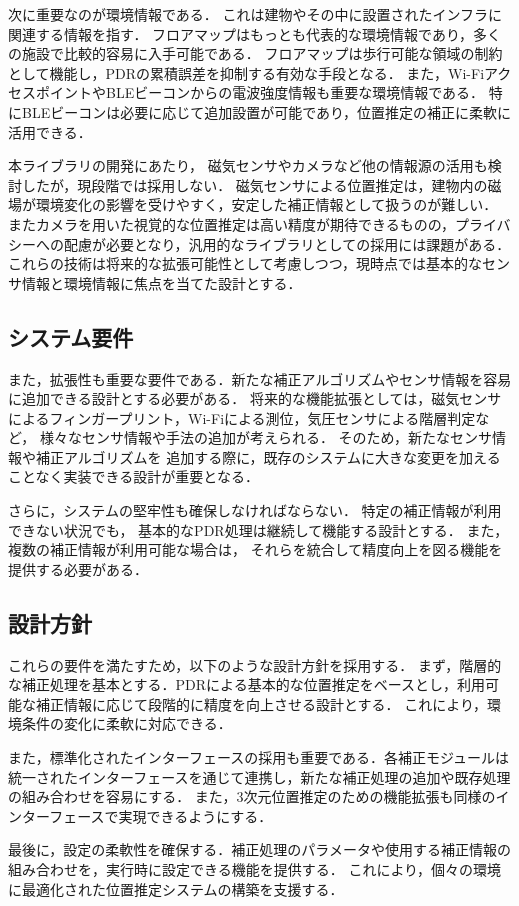 次に重要なのが環境情報である．
これは建物やその中に設置されたインフラに関連する情報を指す．
フロアマップはもっとも代表的な環境情報であり，多くの施設で比較的容易に入手可能である．
フロアマップは歩行可能な領域の制約として機能し，PDRの累積誤差を抑制する有効な手段となる．
また，Wi-FiアクセスポイントやBLEビーコンからの電波強度情報も重要な環境情報である．
特にBLEビーコンは必要に応じて追加設置が可能であり，位置推定の補正に柔軟に活用できる．

本ライブラリの開発にあたり，
磁気センサやカメラなど他の情報源の活用も検討したが，現段階では採用しない．
磁気センサによる位置推定は，建物内の磁場が環境変化の影響を受けやすく，安定した補正情報として扱うのが難しい．
またカメラを用いた視覚的な位置推定は高い精度が期待できるものの，プライバシーへの配慮が必要となり，汎用的なライブラリとしての採用には課題がある．
これらの技術は将来的な拡張可能性として考慮しつつ，現時点では基本的なセンサ情報と環境情報に焦点を当てた設計とする．

\subsection{システム要件}

また，拡張性も重要な要件である．新たな補正アルゴリズムやセンサ情報を容易に追加できる設計とする必要がある．
将来的な機能拡張としては，磁気センサによるフィンガープリント，Wi-Fiによる測位，気圧センサによる階層判定など，
様々なセンサ情報や手法の追加が考えられる．
そのため，新たなセンサ情報や補正アルゴリズムを
追加する際に，既存のシステムに大きな変更を加えることなく実装できる設計が重要となる．

さらに，システムの堅牢性も確保しなければならない．
特定の補正情報が利用できない状況でも，
基本的なPDR処理は継続して機能する設計とする．
また，複数の補正情報が利用可能な場合は，
それらを統合して精度向上を図る機能を提供する必要がある．

\subsection{設計方針}

これらの要件を満たすため，以下のような設計方針を採用する．
まず，階層的な補正処理を基本とする．PDRによる基本的な位置推定をベースとし，利用可能な補正情報に応じて段階的に精度を向上させる設計とする．
これにより，環境条件の変化に柔軟に対応できる．

また，標準化されたインターフェースの採用も重要である．各補正モジュールは統一されたインターフェースを通じて連携し，新たな補正処理の追加や既存処理の組み合わせを容易にする．
また，3次元位置推定のための機能拡張も同様のインターフェースで実現できるようにする．

最後に，設定の柔軟性を確保する．補正処理のパラメータや使用する補正情報の組み合わせを，実行時に設定できる機能を提供する．
これにより，個々の環境に最適化された位置推定システムの構築を支援する．

